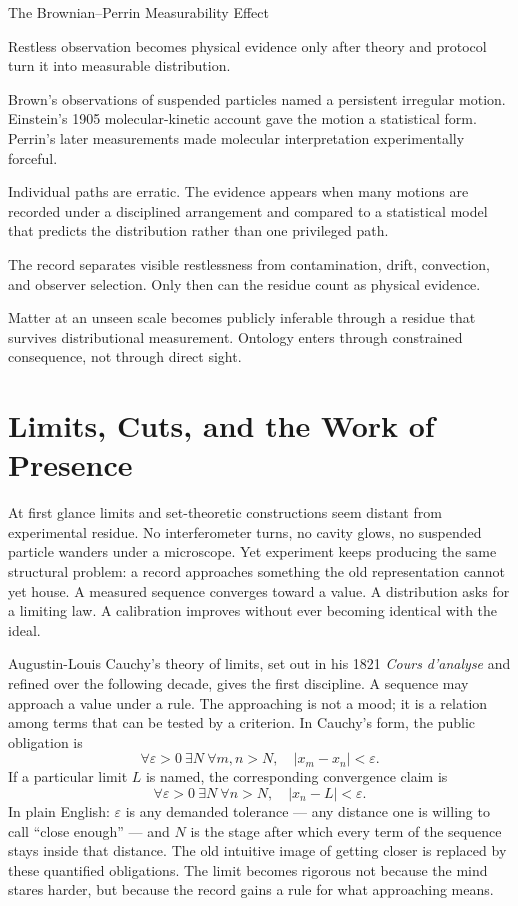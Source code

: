 \begin{phenom}{The Brownian--Perrin Measurability Effect~\cite{brown1828,einstein1905brownian,perrin1909}}
\label{ph:brownian-perrin-measurability}

\PhStatement
Restless observation becomes physical evidence only after theory and protocol
turn it into measurable distribution.

\PhOrigin
Brown's observations of suspended particles named a persistent irregular
motion. Einstein's 1905 molecular-kinetic account gave the motion a
statistical form. Perrin's later measurements made molecular interpretation
experimentally forceful.

\PhObservation
Individual paths are erratic. The evidence appears when many motions are
recorded under a disciplined arrangement and compared to a statistical model
that predicts the distribution rather than one privileged path.

\PhConstraint
The record separates visible restlessness from contamination, drift,
convection, and observer selection. Only then can the residue count as
physical evidence.

\PhConsequence
Matter at an unseen scale becomes publicly inferable through a residue that
survives distributional measurement. Ontology enters through constrained
consequence, not through direct sight.
\end{phenom}

\section{Limits, Cuts, and the Work of Presence}

At first glance limits and set-theoretic constructions seem distant from
experimental residue. No interferometer turns, no cavity glows, no
suspended particle wanders under a microscope. Yet experiment keeps
producing the same structural problem: a record approaches something the
old representation cannot yet house. A measured sequence converges toward
a value. A distribution asks for a limiting law. A calibration improves
without ever becoming identical with the ideal.

Augustin-Louis Cauchy's theory of limits, set out in his 1821 \emph{Cours
d'analyse} and refined over the following decade, gives the first
discipline. A sequence may approach a value under a rule. The approaching
is not a mood; it is a relation among terms that can be tested by a
criterion. In Cauchy's form, the public obligation is
\[
  \forall \varepsilon>0\ \exists N\ \forall m,n>N,\quad
  |x_m-x_n|<\varepsilon .
\]
If a particular limit \(L\) is named, the corresponding convergence claim
is
\[
  \forall \varepsilon>0\ \exists N\ \forall n>N,\quad
  |x_n-L|<\varepsilon .
\]
In plain English: \(\varepsilon\) is any demanded tolerance --- any
distance one is willing to call ``close enough'' --- and \(N\) is the
stage after which every term of the sequence stays inside that distance.
The old intuitive image of getting closer is replaced by these quantified
obligations. The limit becomes rigorous not because the mind stares
harder, but because the record gains a rule for what approaching means.


